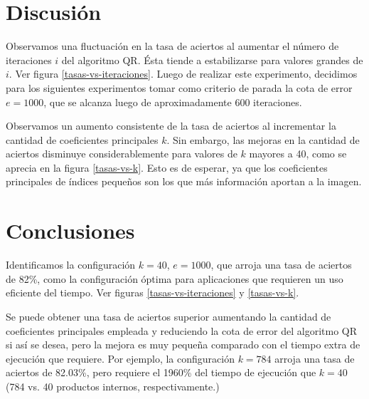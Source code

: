 \documentclass[a4paper,10pt,twoside]{article}
\begin{document}


\section{Discusión}

Observamos una fluctuación en la tasa de aciertos al aumentar el número de iteraciones $i$ del algoritmo QR. Ésta tiende a estabilizarse para valores grandes de $i$. Ver figura \ref{tasas-vs-iteraciones}. Luego de realizar este experimento, decidimos para los siguientes experimentos tomar como criterio de parada la cota de error $e = 1000$, que se alcanza luego de aproximadamente 600 iteraciones.

Observamos un aumento consistente de la tasa de aciertos al incrementar la cantidad de coeficientes principales $k$. Sin embargo, las mejoras en la cantidad de aciertos disminuye considerablemente para valores de $k$ mayores a 40, como se aprecia en la figura \ref{tasas-vs-k}. Esto es de esperar, ya que los coeficientes principales de índices pequeños son los que más información aportan a la imagen.




\section{Conclusiones}

Identificamos la configuración $k = 40$, $e = 1000$, que arroja una tasa de aciertos de 82\%, como la configuración óptima para aplicaciones que requieren un uso eficiente del tiempo. Ver figuras \ref{tasas-vs-iteraciones} y \ref{tasas-vs-k}.

Se puede obtener una tasa de aciertos superior aumentando la cantidad de coeficientes principales empleada y reduciendo la cota de error del algoritmo QR si así se desea, pero la mejora es muy pequeña comparado con el tiempo extra de ejecución que requiere. Por ejemplo, la configuración $k = 784$ arroja una tasa de aciertos de 82.03\%, pero requiere el 1960\% del tiempo de ejecución que $k = 40$ (784 vs. 40 productos internos, respectivamente.)
\end{document}
